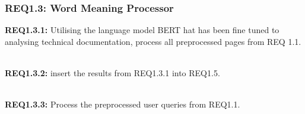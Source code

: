\subsubsection{REQ1.3: Word Meaning Processor}

\textbf{REQ1.3.1: }Utilising the language model BERT hat has been fine tuned to analysing technical documentation, process all preprocessed pages from REQ 1.1.\par
\textbf{\\REQ1.3.2: }insert the results from REQ1.3.1 into REQ1.5.\par
\textbf{\\REQ1.3.3: }Process the preprocessed user queries from REQ1.1.
